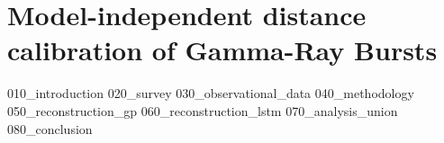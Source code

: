 \chapter{Model-independent distance calibration of Gamma-Ray Bursts}
{010_introduction}
{020_survey}
{030_observational_data}
{040_methodology}
{050_reconstruction_gp}
{060_reconstruction_lstm}
{070_analysis_union}
{080_conclusion}


